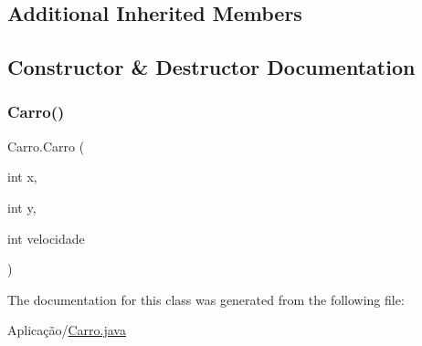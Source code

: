 \subsection*{Additional Inherited Members}


\subsection{Constructor \& Destructor Documentation}
\mbox{\label{class_carro_a5637631ba38ec32090b43e8932071695}} 
\subsubsection{\texorpdfstring{Carro()}{Carro()}}
{\footnotesize\ttfamily Carro.\+Carro (\begin{DoxyParamCaption}\item[{int}]{x,  }\item[{int}]{y,  }\item[{int}]{velocidade }\end{DoxyParamCaption})}



The documentation for this class was generated from the following file\+:\begin{DoxyCompactItemize}
\item 
Aplicação/\mbox{\hyperlink{_carro_8java}{Carro.\+java}}\end{DoxyCompactItemize}
